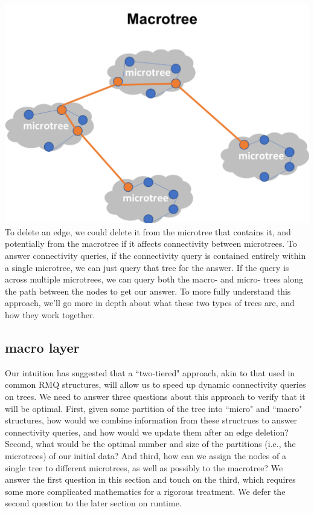 \documentclass{article}
\begin{document}
\includegraphics[scale=0.6]{DTC.png}\\

To delete an edge, we could delete it from the microtree that contains it, and potentially from the macrotree if it affects connectivity between microtrees.  To answer connectivity queries, if the connectivity query is contained entirely within a single microtree, we can just query that tree for the answer.  If the query is across multiple microtrees, we can query both the macro- and micro- trees along the path between the nodes to get our answer.  To more fully understand this approach, we'll go more in depth about what these two types of trees are, and how they work together.

\subsection{macro layer}
Our intuition has suggested that a ``two-tiered" approach, akin to that used in common RMQ structures, will allow us to speed up dynamic connectivity queries on trees. We need to answer three questions about this approach to verify that it will be optimal. First, given some partition of the tree into ``micro" and ``macro" structures, how would we combine information from these structrues to answer connectivity queries, and how would we update them after an edge deletion? Second, what would be the optimal number and size of the partitions (i.e., the microtrees) of our initial data? And third, how can we assign the nodes of a single tree to different microtrees, as well as possibly to the macrotree? We answer the first question in this section and touch on the third, which requires some more complicated mathematics for a rigorous treatment. We defer the second question to the later section on runtime.
\end{document}
